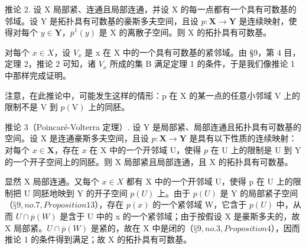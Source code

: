 推论 2. 设 X 局部紧、连通且局部连通，并设 X 的每一点都有一个具有可数基的邻域。设 Y 是拓扑具有可数基的豪斯多夫空间，且设 \(p: \mathbf{X} \to \mathbf{Y}\) 是连续映射，使得对每个 \(y \in \mathbf{Y}\)，\(\overline{p}^1(y)\) 是 X 的离散子空间。则 X 的拓扑具有可数基。

对每个 \(x \in X\)，设 \(V_{x}\) 是 x 在 X 中的一个具有可数基的紧邻域。由 §9，第 4 目，定理 2，推论 2 可知，诸 \(V_{x}\) 所成的集 B 满足定理 1 的条件，于是我们像推论 1 中那样完成证明。

注意，在此推论中，可能发生这样的情形：p 在 X 的某一点的任意小邻域 V 上的限制不是 V 到 \(p(\mathrm{V})\) 上的同胚。

推论 3（Poincaré-Volterra 定理）. 设 Y 是局部紧、局部连通且拓扑具有可数基的空间。设 X 是连通豪斯多夫空间，且设 \(p: \mathbf{X} \to \mathbf{Y}\) 是具有以下性质的连续映射：对每个 \(x \in \mathbf{X}\)，存在 \(x\) 在 X 中的一个开邻域 U，使得 \(p\) 在 U 上的限制是 U 到 Y 的一个开子空间上的同胚。则 X 局部紧且局部连通，且 X 的拓扑具有可数基。

显然 X 局部连通。又每个 \(x \in X\) 都有 X 中的一个开邻域 U，使得 p 在 U 上的限制把 U 同胚地映到 Y 的开子空间 \(p(U)\) 上。由于 \(p(U)\) 是 Y 的局部紧子空间（\(§ 9, no. 7, Proposition 13\)），存在 \(p(x)\) 的一个紧邻域 W，它含于 \(p(U)\) 中，从而 \(U \cap \overline{p}(W)\) 是含于 U 中的 x 的一个紧邻域；由于按假设 X 是豪斯多夫的，故 X 局部紧。\(U \cap \overline{p}(W)\) 是紧的，故在 X 中是闭的（\(§ 9, no. 3, Proposition 4\)），因而推论 1 的条件得到满足；故 X 的拓扑具有可数基。

